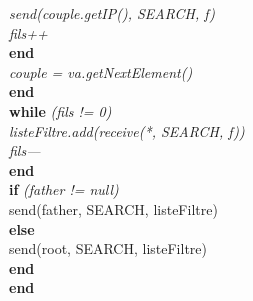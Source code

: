 \documentclass[a4paper,11pt]{report}
\begin{document}
\begin{flushleft}
\begin{framed}
\begin{enumerate}
\begin{tabbing}
					\> \> \> \textit{send(couple.getIP(), SEARCH, f)}\\
					\> \> \> \textit{fils++}\\
					\> \> \textbf{end}\\
					\> \> \textit{couple = va.getNextElement()}\\
					\> \textbf{end}\\ 
					\> \textbf{while} \= \textit{(fils != 0)}\\
					\> \> \textit{listeFiltre.add(receive(*, SEARCH, f))}\\
					\> \> \textit{fils---}\\
					\> \textbf{end}\\
					\> \textbf{if} \= \textit{(father != null)}\\
					\> \> send(father, SEARCH, listeFiltre)\\
					\> \textbf{else}\\
					\> \> send(root, SEARCH, listeFiltre)\\
					\> \textbf{end}\\
				\textbf{end}
			\end{tabbing}
		\end{enumerate}
	\end{framed}
\end{flushleft}
\end{document}
